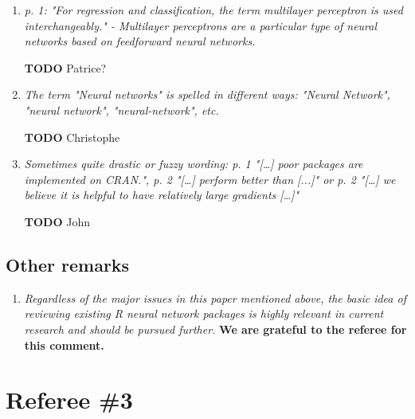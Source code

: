 \documentclass[12pt]{article}
\newcommand{\red}[1]{{\color{red}#1}}
\begin{document}
\begin{enumerate}
\item \textit{p. 1: "For regression and classification, the term multilayer perceptron is used interchangeably." - Multilayer perceptrons are a particular type of neural networks based on feedforward neural networks.}

\textbf{TODO}
\red{Patrice?}

\item \textit{The term "Neural networks" is spelled in different ways: "Neural Network", "neural network", "neural-network", etc.}

\textbf{TODO}
\red{Christophe}
 
\item \textit{Sometimes quite drastic or fuzzy wording: p. 1 "[…] poor packages are implemented on CRAN.", p. 2 "[…] perform better than [...]" or p. 2 "[…] we believe it is helpful to have relatively large gradients […]"}

\textbf{TODO}
\red{John}

\end{enumerate}

\subsection*{Other remarks}

\begin{enumerate}
\item \textit{Regardless of the major issues in this paper mentioned above, the basic idea of reviewing existing R neural network packages is highly relevant in current research and should be pursued further.
}
\textbf{We are grateful to the referee for this comment.}
\end{enumerate}



\section{Referee \#3}\label{referee3}
\end{document}
